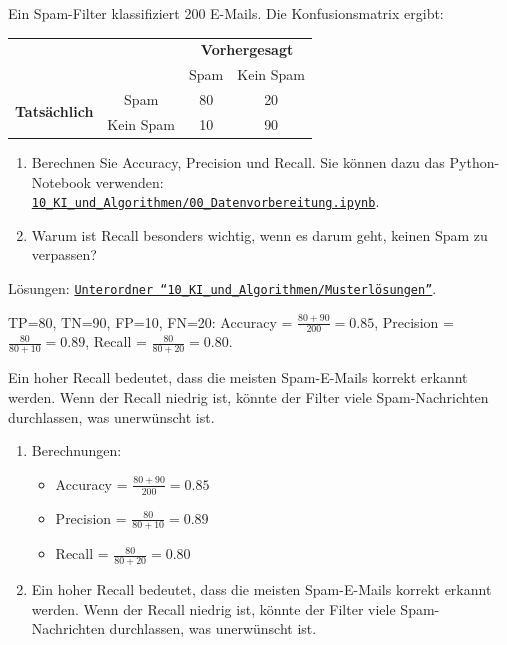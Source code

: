 \begin{myexercise}
    Ein Spam-Filter klassifiziert 200 E-Mails.
    Die Konfusionsmatrix ergibt:
    \begin{center}
        \begin{tabular}{cc|cc}
                                                  &           & \multicolumn{2}{c}{\textbf{Vorhergesagt}} \\
                                                  &           & Spam                                         & Kein Spam \\
            \hline
            \multirow{2}{*}{\textbf{Tatsächlich}} & Spam      & 80                                           & 20 \\
                                                  & Kein Spam & 10                                           & 90 \\
        \end{tabular}
    \end{center}

    \begin{enumerate}
        \item Berechnen Sie Accuracy, Precision und Recall. Sie können dazu das Python-Notebook verwenden: \href{\notebookurl}{\texttt{10\_KI\_und\_Algorithmen/00\_Datenvorbereitung.ipynb}}.
        \item Warum ist Recall besonders wichtig, wenn es darum geht, keinen Spam zu verpassen?
    \end{enumerate}
    \begin{myanswer}
        Lösungen: \href{\notebookurl}{\texttt{Unterordner \enquote{10\_KI\_und\_Algorithmen/Musterlösungen}}}.\

         TP=80, TN=90, FP=10, FN=20:
         Accuracy = $\frac{80 + 90}{200} = 0.85$,
         Precision = $\frac{80}{80 + 10} = 0.89$,
         Recall = $\frac{80}{80 + 20} = 0.80$.

         Ein hoher Recall bedeutet, dass die meisten Spam-E-Mails korrekt erkannt werden. Wenn der Recall niedrig ist, könnte der Filter viele Spam-Nachrichten durchlassen, was unerwünscht ist.
        \begin{enumerate}
            \item Berechnungen:
                  \begin{itemize}
                      \item Accuracy = $\frac{80 + 90}{200} = 0.85$
                      \item Precision = $\frac{80}{80 + 10} = 0.89$
                      \item Recall = $\frac{80}{80 + 20} = 0.80$
                  \end{itemize}
            \item Ein hoher Recall bedeutet, dass die meisten Spam-E-Mails korrekt erkannt werden. Wenn der Recall niedrig ist, könnte der Filter viele Spam-Nachrichten durchlassen, was unerwünscht ist.
        \end{enumerate}
    \end{myanswer}
\end{myexercise}
